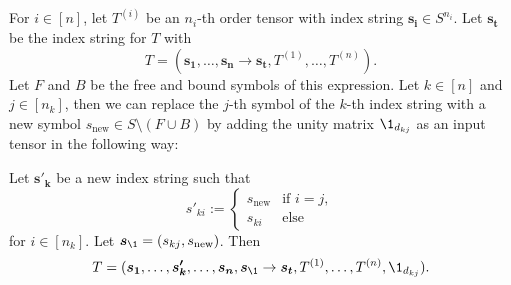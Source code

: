 \begin{lemma}
    \label{lemma:nested_einsum:1}
    For $i \in [n]$, let $T^{(i)}$ be an $n_i$-th order tensor with index string $\bm{s_i} \in S^{n_i}$.
    Let $\bm{s_t}$ be the index string for $T$ with
    $$T = (\bm{s_1}, \dots, \bm{s_n} \rightarrow \bm{s_t}, T^{(1)}, \dots, T^{(n)}).$$
    Let $F$ and $B$ be the free and bound symbols of this expression.
    Let $k \in [n]$ and $j \in [n_k]$, then we can replace the $j$-th symbol of the $k$-th index string with a new symbol $s_{\text{new}} \in S \setminus (F \cup B)$ by adding the unity matrix $\1_{d_{kj}}$ as an input tensor in the following way:

    Let $\bm{s'_k}$ be a new index string such that
    $$s'_{ki} := \begin{cases}
            s_{\text{new}} & \text{if $i = j$}, \\
            s_{ki}         & \text{else}
        \end{cases}$$
    for $i \in [n_k]$.
    Let $\bm{s_\1} = (s_{kj}, s_{\text{new}})$.
    Then
    $$T = (\bm{s_1}, \dots, \bm{s'_k}, \dots, \bm{s_n}, \bm{s_\1} \rightarrow \bm{s_t}, T^{(1)}, \dots, T^{(n)}, \1_{d_{kj}}).$$
\end{lemma}

